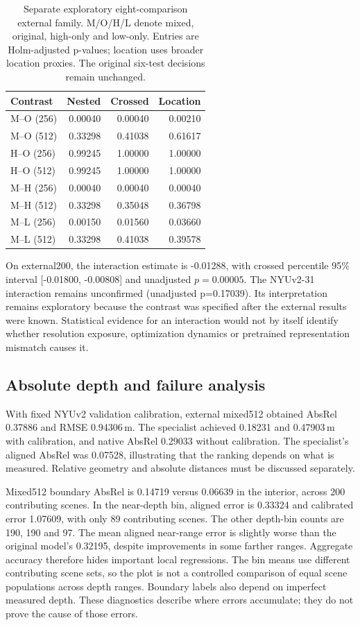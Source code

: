 \begin{table}[t]
\centering\small
\caption{Separate exploratory eight-comparison external family. M/O/H/L denote mixed, original, high-only and low-only. Entries are Holm-adjusted p-values; location uses broader location proxies. The original six-test decisions remain unchanged.}
\label{tab:exploratory}
\begin{tabular}{lrrr}\toprule
Contrast & Nested & Crossed & Location\\\midrule
M--O (256) & 0.00040 & 0.00040 & 0.00210\\
M--O (512) & 0.33298 & 0.41038 & 0.61617\\
H--O (256) & 0.99245 & 1.00000 & 1.00000\\
H--O (512) & 0.99245 & 1.00000 & 1.00000\\
M--H (256) & 0.00040 & 0.00040 & 0.00040\\
M--H (512) & 0.33298 & 0.35048 & 0.36798\\
M--L (256) & 0.00150 & 0.01560 & 0.03660\\
M--L (512) & 0.33298 & 0.41038 & 0.39578\\
\bottomrule\end{tabular}
\end{table}

On external200, the interaction estimate is -0.01288, with crossed percentile 95\% interval [-0.01800, -0.00808] and unadjusted $p=0.00005$. The NYUv2-31 interaction remains unconfirmed (unadjusted p=0.17039). Its interpretation remains exploratory because the contrast was specified after the external results were known. Statistical evidence for an interaction would not by itself identify whether resolution exposure, optimization dynamics or pretrained representation mismatch causes it.

\subsection{Absolute depth and failure analysis}
With fixed NYUv2 validation calibration, external mixed512 obtained AbsRel 0.37886 and RMSE 0.94306\,m. The specialist achieved 0.18231 and 0.47903\,m with calibration, and native AbsRel 0.29033 without calibration. The specialist's aligned AbsRel was 0.07528, illustrating that the ranking depends on what is measured. Relative geometry and absolute distances must be discussed separately.

Mixed512 boundary AbsRel is 0.14719 versus 0.06639 in the interior, across 200 contributing scenes. In the near-depth bin, aligned error is 0.33324 and calibrated error 1.07609, with only 89 contributing scenes. The other depth-bin counts are 190, 190 and 97. The mean aligned near-range error is slightly worse than the original model's 0.32195, despite improvements in some farther ranges. Aggregate accuracy therefore hides important local regressions. The bin means use different contributing scene sets, so the plot is not a controlled comparison of equal scene populations across depth ranges. Boundary labels also depend on imperfect measured depth. These diagnostics describe where errors accumulate; they do not prove the cause of those errors.

